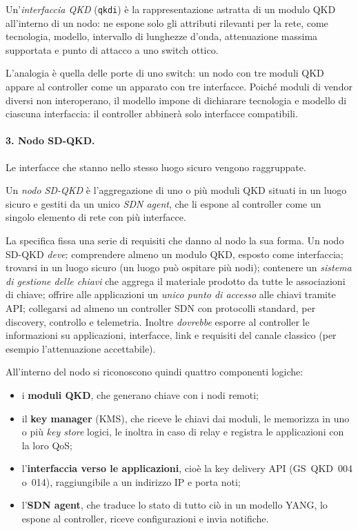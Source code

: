 \begin{definition}
Un'\emph{interfaccia QKD} (\texttt{qkdi}) è la rappresentazione astratta di
un modulo QKD all'interno di un nodo: ne espone solo gli attributi rilevanti
per la rete, come tecnologia, modello, intervallo di lunghezze d'onda,
attenuazione massima supportata e punto di attacco a uno switch ottico.
\end{definition}

L'analogia è quella delle porte di uno switch: un nodo con tre moduli QKD
appare al controller come un apparato con tre interfacce. Poiché moduli di
vendor diversi non interoperano, il modello impone di dichiarare tecnologia
e modello di ciascuna interfaccia: il controller abbinerà solo interfacce
compatibili.

\paragraph{3. Nodo SD-QKD.}
Le interfacce che stanno nello stesso luogo sicuro vengono raggruppate.

\begin{definition}
Un \emph{nodo SD-QKD} è l'aggregazione di uno o più moduli QKD situati in
un luogo sicuro e gestiti da un unico \emph{SDN agent}, che li espone al
controller come un singolo elemento di rete con più interfacce.
\end{definition}

La specifica fissa una serie di requisiti che danno al nodo la sua forma.
Un nodo SD-QKD \emph{deve}: comprendere almeno un modulo QKD, esposto come
interfaccia; trovarsi in un luogo sicuro (un luogo può ospitare più nodi);
contenere un \emph{sistema di gestione delle chiavi} che aggrega il
materiale prodotto da tutte le associazioni di chiave; offrire alle
applicazioni un \emph{unico punto di accesso} alle chiavi tramite API;
collegarsi ad almeno un controller SDN con protocolli standard, per
discovery, controllo e telemetria. Inoltre \emph{dovrebbe} esporre al
controller le informazioni su applicazioni, interfacce, link e requisiti
del canale classico (per esempio l'attenuazione accettabile).

All'interno del nodo si riconoscono quindi quattro componenti logiche:
\begin{itemize}
  \item i \textbf{moduli QKD}, che generano chiave con i nodi remoti;
  \item il \textbf{key manager} (KMS), che riceve le chiavi dai moduli,
        le memorizza in uno o più \emph{key store} logici, le inoltra in
        caso di relay e registra le applicazioni con la loro QoS;
  \item l'\textbf{interfaccia verso le applicazioni}, cioè la key
        delivery API (GS~QKD~004 o~014), raggiungibile a un indirizzo
        IP e porta noti;
  \item l'\textbf{SDN agent}, che traduce lo stato di tutto ciò in un
        modello YANG, lo espone al controller, riceve configurazioni e
        invia notifiche.
\end{itemize}

